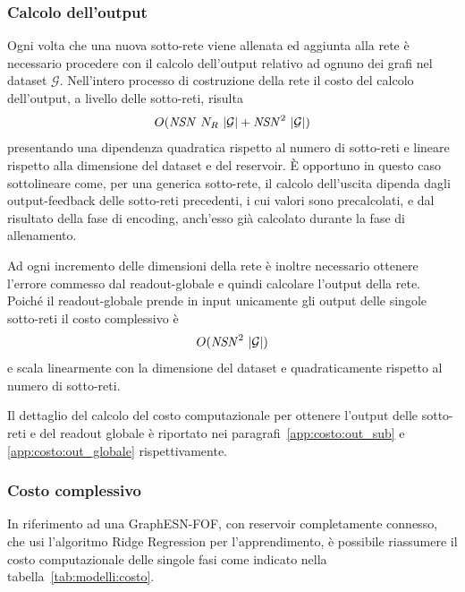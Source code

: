 \subsubsection*{Calcolo dell'output}
Ogni volta che una nuova sotto-rete viene allenata ed aggiunta alla rete è necessario procedere con il calcolo dell'output relativo ad ognuno dei grafi nel dataset $\mathcal{G}$. Nell'intero processo di costruzione della rete il costo del calcolo dell'output, a livello delle sotto-reti, risulta 
\begin{equation}
	O(\mathit{NSN}\ N_R\ \lvert\mathcal{G}\rvert + \mathit{NSN}^2\ \lvert\mathcal{G}\rvert)
\end{equation}
presentando una dipendenza quadratica rispetto al numero di sotto-reti e lineare rispetto alla dimensione del dataset e del reservoir.
\`E opportuno in questo caso sottolineare come, per una generica sotto-rete, il calcolo dell'uscita dipenda dagli output-feedback delle sotto-reti precedenti, i cui valori sono precalcolati, e dal risultato della fase di encoding, anch'esso già calcolato durante la fase di allenamento.

Ad ogni incremento delle dimensioni della rete è inoltre necessario ottenere l'errore commesso dal readout-globale e quindi calcolare l'output della rete. Poiché il readout-globale prende in input unicamente gli output delle singole sotto-reti il costo complessivo è
\begin{equation}
	O(\mathit{NSN}^2\ \abs{\mathcal{G}})
\end{equation}
e scala linearmente con la dimensione del dataset e quadraticamente rispetto al numero di sotto-reti.

Il dettaglio del calcolo del costo computazionale per ottenere l'output delle sotto-reti e del readout globale è riportato nei paragrafi~\ref{app:costo:out_sub} e \ref{app:costo:out_globale} rispettivamente.

\subsubsection*{Costo complessivo}
In riferimento ad una GraphESN-FOF, con reservoir completamente connesso, che usi l'algoritmo Ridge Regression per l'apprendimento, è  possibile riassumere il costo computazionale delle singole fasi come indicato nella tabella~\ref{tab:modelli:costo}.

